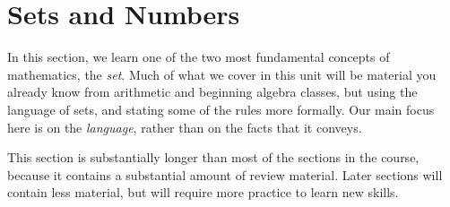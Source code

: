 \section{Sets and Numbers}
In this section, we learn one of the two most fundamental concepts of mathematics, the \emph{set}. Much of what we cover in this unit will be material you already know from arithmetic and beginning algebra classes, but using the language of sets, and stating some of the rules more formally. Our main focus here is on the \emph{language}, rather than on the facts that it conveys.

This section is substantially longer than most of the sections in the course, because it contains a substantial amount of review material. Later sections will contain less material, but will require more practice to learn new skills.













%





